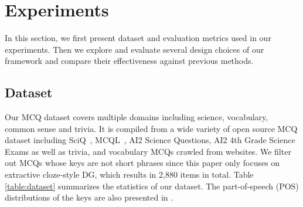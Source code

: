 \section{Experiments}
\label{sec:experiment}
In this section, we first present dataset and evaluation metrics used in our experiments. Then we explore and evaluate several design choices of our framework 
and compare their effectiveness against previous methods.

\subsection{Dataset}
\label{sec:data}
Our MCQ dataset covers multiple domains including science,  
vocabulary, common sense and trivia.
It is compiled from a wide variety of open source  
MCQ dataset including SciQ~\cite{welbl2017crowdsourcing}, 
MCQL~\cite{liang2018distractor}, AI2 Science Questions, 
AI2 4th Grade Science Exams as well as trivia, and 
vocabulary MCQs crawled from websites. 
We filter out MCQs whose keys are not short phrases since this paper only 
focuses on extractive cloze-style DG, 
which results in 2,880 items in total. 
Table \ref{table:dataset} summarizes the statistics of our dataset. The part-of-speech (POS) distributions of the keys are also presented in .

